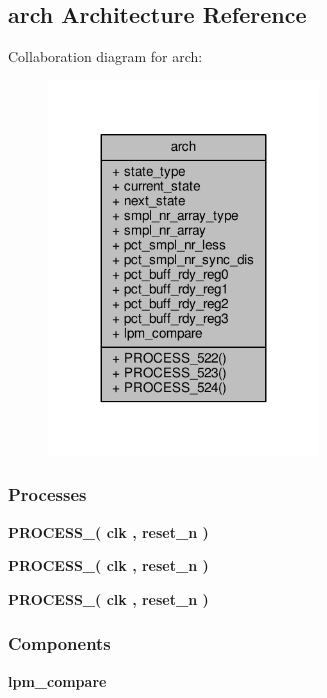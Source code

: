 \subsection{arch Architecture Reference}
\label{classp2d__clr__fsm_1_1arch}


Collaboration diagram for arch\+:\nopagebreak
\begin{figure}[H]
\begin{center}
\leavevmode
\includegraphics[width=203pt]{d7/da0/classp2d__clr__fsm_1_1arch__coll__graph}
\end{center}
\end{figure}
\subsubsection*{Processes}
 \begin{DoxyCompactItemize}
\item 
{\bf P\+R\+O\+C\+E\+S\+S\+\_}{\bfseries  ( {\bfseries {\bfseries {\bf clk}} \textcolor{vhdlchar}{ }} , {\bfseries {\bfseries {\bf reset\+\_\+n}} \textcolor{vhdlchar}{ }} )}
\item 
{\bf P\+R\+O\+C\+E\+S\+S\+\_}{\bfseries  ( {\bfseries {\bfseries {\bf clk}} \textcolor{vhdlchar}{ }} , {\bfseries {\bfseries {\bf reset\+\_\+n}} \textcolor{vhdlchar}{ }} )}
\item 
{\bf P\+R\+O\+C\+E\+S\+S\+\_}{\bfseries  ( {\bfseries {\bfseries {\bf clk}} \textcolor{vhdlchar}{ }} , {\bfseries {\bfseries {\bf reset\+\_\+n}} \textcolor{vhdlchar}{ }} )}
\end{DoxyCompactItemize}
\subsubsection*{Components}
 \begin{DoxyCompactItemize}
\item 
{\bf lpm\+\_\+compare}  {\bfseries }  
\end{DoxyCompactItemize}
